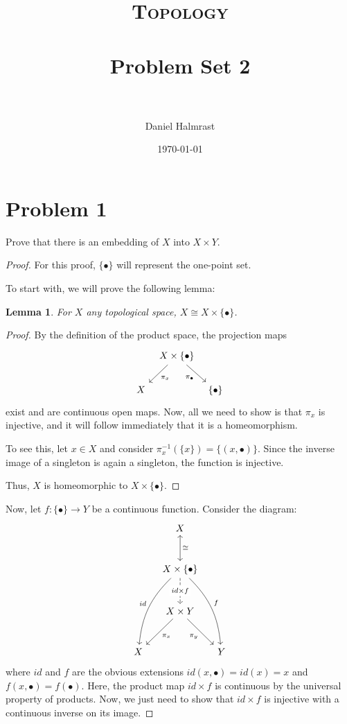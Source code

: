 \documentclass[fontsize=11pt]{scrartcl} %
\title{	
\normalfont \normalsize 
\textsc{Topology} \\ [25pt] %
\horrule{0.5pt} \\[0.4cm] %
\huge Problem Set 2\\ %
\horrule{2pt} \\[0.5cm] %
}
\author{Daniel Halmrast} %
\date{\normalsize\today} %
\numberwithin{equation}{section} %
\numberwithin{figure}{section} %
\numberwithin{table}{section} %
\newtheorem*{lemma}{Lemma}
\begin{document}
\maketitle %

\section*{Problem 1}
Prove that there is an embedding of $X$ into $X\times Y$.
\\
\begin{proof}
For this proof, $\{\bullet\}$ will represent the one-point set.

To start with, we will prove the following lemma:
\begin{lemma}
For $X$ any topological space, $X\cong X\times\{\bullet\}$.
\end{lemma}
\begin{proof}
By the definition of the product space, the projection maps
\[
\begin{tikzcd}[column sep=tiny]
 & X\times\{\bullet\} \arrow[ld,"\pi_x"] \arrow[rd, "\pi_{\bullet}" swap]\\
X & & \{\bullet\}
\end{tikzcd}
\]
exist and are continuous open maps. Now, all we need to show is that $\pi_x$ is
injective, and it will follow immediately that it is a homeomorphism.

To see this, let $x\in X$ and consider $\pi_x^{-1}(\{x\}) = \{(x,\bullet)\}$. Since
the inverse image of a singleton is again a singleton, the function is injective.

Thus, $X$ is homeomorphic to $X\times\{\bullet\}$.
\end{proof}

Now, let $f:\{\bullet\}\to Y$ be a continuous function. Consider the diagram:
\[
\begin{tikzcd}[column sep=small, row sep=large]
 & X \arrow[leftrightarrow]{d}{\cong} & \\
 &X\times\{\bullet\} \arrow[d, dashed, "id\times f" description] \arrow[bend right=20, swap]{ddl}{id} \arrow[bend left=20]{ddr}{f}& \\
 &X\times Y \arrow{dl}{\pi_x} \arrow[swap]{dr}{\pi_y} & \\
X & & Y
\end{tikzcd}
\]
where $id$ and $f$ are the obvious extensions $id(x,\bullet) = id(x) = x$ and $f(x,\bullet) = f(\bullet)$.
Here, the product map $id\times f$ is continuous by the universal property of products.
Now, we just need to show that $id\times f$ is injective with a continuous inverse on its image. 


\end{proof}
\end{document}
